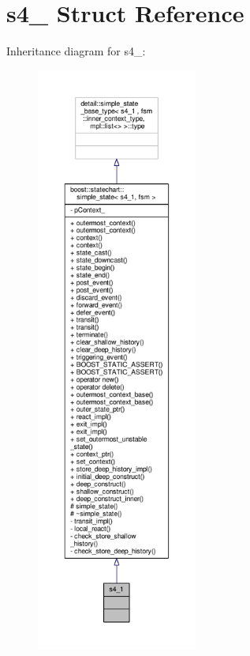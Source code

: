 \hypertarget{structs4__1}{}\section{s4\+\_ Struct Reference}
\label{structs4__1}


Inheritance diagram for s4\+\_\+:
\nopagebreak
\begin{figure}[H]
\begin{center}
\leavevmode
\includegraphics[height=550pt]{structs4__1__inherit__graph}
\end{center}
\end{figure}


